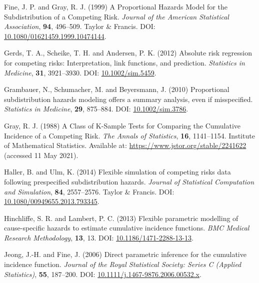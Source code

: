 \documentclass[
  letterpaper,
  DIV=11,
  numbers=noendperiod]{scrreprt}
\newlength{\cslhangindent}
\newlength{\cslentryspacingunit} %
\newenvironment{CSLReferences}[2] %
 {%
  \setlength{\parindent}{0pt}
  \ifodd #1
  \let\oldpar\par
  \def\par{\hangindent=\cslhangindent\oldpar}
  \fi
  \setlength{\parskip}{#2\cslentryspacingunit}
 }%
 {}
\begin{document}
\begin{CSLReferences}{1}{0}
\leavevmode{}%
Fine, J. P. and Gray, R. J. (1999) A {Proportional Hazards Model} for
the {Subdistribution} of a {Competing Risk}. \emph{Journal of the
American Statistical Association}, \textbf{94}, 496--509. Taylor \&
Francis. DOI:
\href{https://doi.org/10.1080/01621459.1999.10474144}{10.1080/01621459.1999.10474144}.

\leavevmode{}%
Gerds, T. A., Scheike, T. H. and Andersen, P. K. (2012) Absolute risk
regression for competing risks: Interpretation, link functions, and
prediction. \emph{Statistics in Medicine}, \textbf{31}, 3921--3930. DOI:
\href{https://doi.org/10.1002/sim.5459}{10.1002/sim.5459}.

\leavevmode{}%
Grambauer, N., Schumacher, M. and Beyersmann, J. (2010) Proportional
subdistribution hazards modeling offers a summary analysis, even if
misspecified. \emph{Statistics in Medicine}, \textbf{29}, 875--884. DOI:
\href{https://doi.org/10.1002/sim.3786}{10.1002/sim.3786}.

\leavevmode{}%
Gray, R. J. (1988) A {Class} of {K-Sample Tests} for {Comparing} the
{Cumulative Incidence} of a {Competing Risk}. \emph{The Annals of
Statistics}, \textbf{16}, 1141--1154. Institute of Mathematical
Statistics. Available at: \url{https://www.jstor.org/stable/2241622}
(accessed 11 May 2021).

\leavevmode{}%
Haller, B. and Ulm, K. (2014) Flexible simulation of competing risks
data following prespecified subdistribution hazards. \emph{Journal of
Statistical Computation and Simulation}, \textbf{84}, 2557--2576. Taylor
\& Francis. DOI:
\href{https://doi.org/10.1080/00949655.2013.793345}{10.1080/00949655.2013.793345}.

\leavevmode{}%
Hinchliffe, S. R. and Lambert, P. C. (2013) Flexible parametric
modelling of cause-specific hazards to estimate cumulative incidence
functions. \emph{BMC Medical Research Methodology}, \textbf{13}, 13.
DOI:
\href{https://doi.org/10.1186/1471-2288-13-13}{10.1186/1471-2288-13-13}.

\leavevmode{}%
Jeong, J.-H. and Fine, J. (2006) Direct parametric inference for the
cumulative incidence function. \emph{Journal of the Royal Statistical
Society: Series C (Applied Statistics)}, \textbf{55}, 187--200. DOI:
\href{https://doi.org/10.1111/j.1467-9876.2006.00532.x}{10.1111/j.1467-9876.2006.00532.x}.


\end{CSLReferences}
\end{document}
